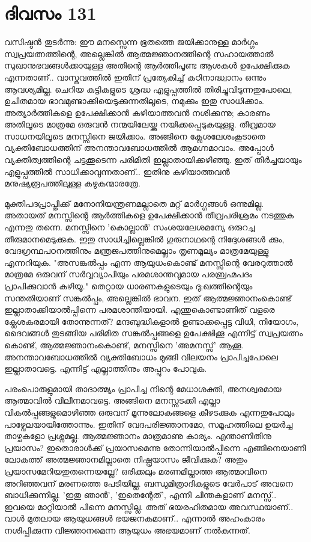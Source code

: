  
\section{ദിവസം 131}


വസിഷ്ഠന്‍ തുടര്‍ന്നു: ഈ മനസ്സെന്ന ഭൂതത്തെ ജയിക്കാനുള്ള മാര്‍ഗ്ഗം സ്വപ്രയത്നത്തിന്റെ, അല്ലെങ്കില്‍ ആത്മജ്ഞാനത്തിന്റെ സഹായത്താല്‍ സുഖാനുഭവങ്ങള്‍ക്കായുള്ള അതിന്റെ ആര്‍ത്തിപൂണ്ട  ആശകള്‍ ഉപേക്ഷിക്കുക എന്നതാണ്‌.. വാസ്തവത്തില്‍ ഇതിന്‌ പ്രത്യേകിച്ച്‌ കഠിനാദ്ധ്വാനം ഒന്നും ആവശ്യമില്ല. ചെറിയ കുട്ടികളുടെ ശ്രദ്ധ എളുപ്പത്തില്‍ തിരിച്ചുവിടുന്നതുപോലെ, ഉചിതമായ ഭാവമുണ്ടാക്കിയെടുക്കുന്നതിലൂടെ, നമുക്കും ഇതു സാധിക്കാം. അത്യാര്‍ത്തികളെ ഉപേക്ഷിക്കാന്‍ കഴിയാത്തവന്‍ നശിക്കുന്നു; കാരണം അതിലൂടെ മാത്രമേ ഒരുവന്‍ നന്മയിലേയ്ക്കു നയിക്കപ്പെടുകയുള്ളു. തീവ്രമായ സാധനയിലൂടെ മനസ്സിനെ ജയിക്കാം. അങ്ങിനെ ക്ലേശലേശംകൂടാതെ വ്യക്തിബോധത്തിന്‌ അനന്താവബോധത്തില്‍ ആമഗ്നമാവാം. അപ്പോള്‍ വ്യക്തിത്വത്തിന്റെ ചട്ടക്കൂടെന്ന പരിമിതി ഇല്ലാതായിക്കഴിഞ്ഞു. ഇത്‌ തീര്‍ച്ചയായും എളുപ്പത്തില്‍ സാധിക്കാവുന്നതാണ്‌.. ഇതിനു കഴിയാത്തവന്‍ മനുഷ്യരൂപത്തിലുള്ള കഴുകന്മാരത്രേ.

മുക്തിപദപ്രാപ്തിക്ക്‌ മനോനിയന്ത്രണമല്ലാതെ മറ്റ്‌ മാര്‍ഗ്ഗങ്ങള്‍ ഒന്നുമില്ല. അതായത്‌ മനസ്സിന്റെ ആര്‍ത്തികളെ ഉപേക്ഷിക്കാന്‍ തീവ്രപരിശ്രമം നടത്തുക എന്നതു തന്നെ. മനസ്സിനെ 'കൊല്ലാന്‍' സംശയലേശമന്യേ ഒരുറച്ച തീരുമാനമെടുക്കുക. ഇതു സാധിച്ചില്ലെങ്കില്‍ ഗുരുനാഥന്റെ നിദ്ദേശങ്ങള്‍ ക്കും, വേദഗ്രന്ഥപഠനത്തിനും മന്ത്രജപത്തിനുമെല്ലാം തൃണമൂല്യം മാത്രമേയുള്ളു എന്നറിയുക. "അസങ്കല്‍പ്പം എന്ന ആയുധംകൊണ്ട്‌ മനസ്സിന്റെ വേരറുത്താല്‍ മാത്രമേ ഒരുവന്‌ സര്‍വ്വവ്യാപിയും പരമശാന്തവുമായ പരബ്രഹ്മപദം പ്രാപിക്കുവാന്‍ കഴിയൂ." തെറ്റായ ധാരണകളുടെയും ദു;ഖത്തിന്റെയും സന്തതിയാണ്‌ സങ്കല്‍പ്പം, അല്ലെങ്കില്‍ ഭാവന. ഇത്‌ ആത്മജ്ഞാനംകൊണ്ട്‌ ഇല്ലാതാക്കിയാല്‍പ്പിന്നെ പരമശാന്തിയായി. എന്തുകൊണ്ടാണിത്‌ വളരെ ക്ലേശകരമായി തോന്നുന്നത്‌? മന്ദബുദ്ധികളാല്‍ ഉണ്ടാക്കപ്പെട്ട വിധി, നിയോഗം, ദൈവങ്ങള്‍ തുടങ്ങിയ പരിമിത സങ്കല്‍പ്പങ്ങളെ ഉപേക്ഷിക്കൂ എന്നിട്ട്‌ സ്വപ്രയത്നം കൊണ്ട്‌, ആത്മജ്ഞാനംകൊണ്ട്‌, മനസ്സിനെ 'അമനസ്സ്‌' ആക്കൂ. അനന്താവബോധത്തില്‍ വ്യക്തിബോധം മുങ്ങി വിലയനം  പ്രാപിച്ചപോലെ  ഇല്ലാതാവട്ടെ. എന്നിട്ട്‌ എല്ലാത്തിനും അപ്പുറം പോവുക.

പരംപൊരുളുമായി താദാത്മ്യം പ്രാപിച്ച നിന്റെ മേധാശക്തി, അനശ്വരമായ ആത്മാവില്‍ വിലീനമാവട്ടെ. അങ്ങിനെ മനസ്സടക്കി എല്ലാ വികല്‍പ്പങ്ങളുമൊഴിഞ്ഞ ഒരുവന്‌ മൂന്നുലോകങ്ങളെ കീഴടക്കുക എന്നതുപോലും പാഴ്വേലയായിത്തോന്നും. ഇതിന്‌ വേദപരിജ്ഞാനമോ, സമൂഹത്തിലെ ഉയര്‍ച്ച താഴ്ചകളോ പ്രശ്നമല്ല. ആത്മജ്ഞാനം മാത്രമാണു കാര്യം. എന്താണിതിനു പ്രയാസം? ഇതൊരാള്‍ക്ക്‌ പ്രയാസമെന്നു തോന്നിയാല്‍പ്പിന്നെ  എങ്ങിനെയാണീ ലോകത്ത്‌ അത്മജ്ഞാനമില്ലാതെ നിഷ്പ്രയാസം ജീവിക്കുക? അതും പ്രയാസമേറിയതുതന്നെയല്ലേ? ഒരിക്കലും മരണമില്ലാത്ത ആത്മാവിനെ അറിഞ്ഞവന്‌ മരണത്തെ പേടിയില്ല. ബന്ധുമിത്രാദികളുടെ വേര്‍പാട്‌ അവനെ ബാധിക്കുന്നില്ല. 'ഇതു ഞാന്‍', 'ഇതെന്റേത്‌', എന്നീ ചിന്തകളാണ്‌ മനസ്സ്‌.. ഇവയെ മാറ്റിയാല്‍ പിന്നെ മനസ്സില്ല. അത്‌ ഭയരഹിതമായ അവസ്ഥയാണ്‌.. വാള്‍ മുതലായ ആയുധങ്ങള്‍ ഭയജനകമാണ്‌.. എന്നാല്‍ അഹംകാരം നശിപ്പിക്കുന്ന വിജ്ഞാനമെന്ന ആയുധം അഭയമാണ്‌ നല്‍കുന്നത്‌.
